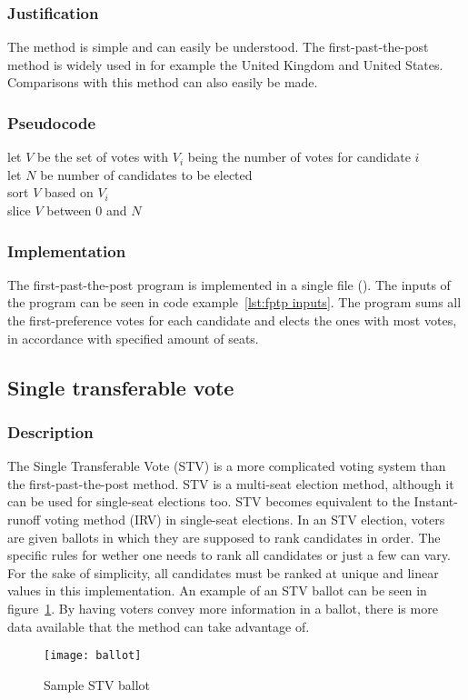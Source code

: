 \documentclass[12pt]{article}
\begin{document}
\subsubsection{Justification}
The method is simple and can easily be understood. The first-past-the-post method is widely used in for example the United Kingdom and United States. Comparisons with this method can also easily be made.
\subsubsection{Pseudocode}
let $V$ be the set of votes with $V_{i}$ being the number of votes for candidate $i$ \\
let $N$ be number of candidates to be elected \\
sort $V$ based on $V_{i}$\\
slice $V$ between $0$ and $N$
\subsubsection{Implementation}
The first-past-the-post program is implemented in a single file (). The inputs of the program can be seen in code example~\ref{lst:fptp inputs}.
The program sums all the first-preference votes for each candidate and elects the ones with most votes, in accordance with specified amount of seats.
\subsection{Single transferable vote}
\subsubsection{Description}
The Single Transferable Vote (STV) is a more complicated voting system than the first-past-the-post method. STV is a multi-seat election method, although it can be used for single-seat elections too. STV becomes equivalent to the Instant-runoff voting method (IRV) in single-seat elections. In an STV election, voters are given ballots in which they are supposed to rank candidates in order. The specific rules for wether one needs to rank all candidates or just a few can vary. For the sake of simplicity, all candidates must be ranked at unique and linear values in this implementation. An example of an STV ballot can be seen in figure~\ref{fig:stv ballot}. By having voters convey more information in a ballot, there is more data available that the method can take advantage of. 
\begin{figure}
	\centering
	\texttt{[image: ballot]}
	\caption{Sample STV ballot}
\label{fig:stv ballot}
\end{figure}
\end{document}
